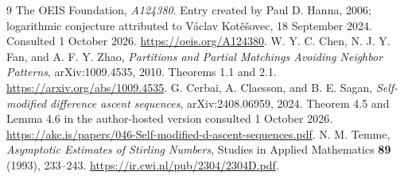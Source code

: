 \documentclass[11pt,letterpaper]{article}
\numberwithin{equation}{section}
\begin{document}
\begin{thebibliography}{9}
 The OEIS Foundation, \emph{A124380}. Entry created by Paul D. Hanna, 2006; logarithmic conjecture attributed to V\'aclav Kot\v e\v sovec, 18 September 2024. Consulted 1 October 2026. \url{https://oeis.org/A124380}.
 W. Y. C. Chen, N. J. Y. Fan, and A. F. Y. Zhao, \emph{Partitions and Partial Matchings Avoiding Neighbor Patterns}, arXiv:1009.4535, 2010. Theorems 1.1 and 2.1. \url{https://arxiv.org/abs/1009.4535}.
 G. Cerbai, A. Claesson, and B. E. Sagan, \emph{Self-modified difference ascent sequences}, arXiv:2408.06959, 2024. Theorem 4.5 and Lemma 4.6 in the author-hosted version consulted 1 October 2026. \url{https://akc.is/papers/046-Self-modified-d-ascent-sequences.pdf}.
 N. M. Temme, \emph{Asymptotic Estimates of Stirling Numbers}, Studies in Applied Mathematics \textbf{89} (1993), 233--243. \url{https://ir.cwi.nl/pub/2304/2304D.pdf}.
\end{thebibliography}
\end{document}
